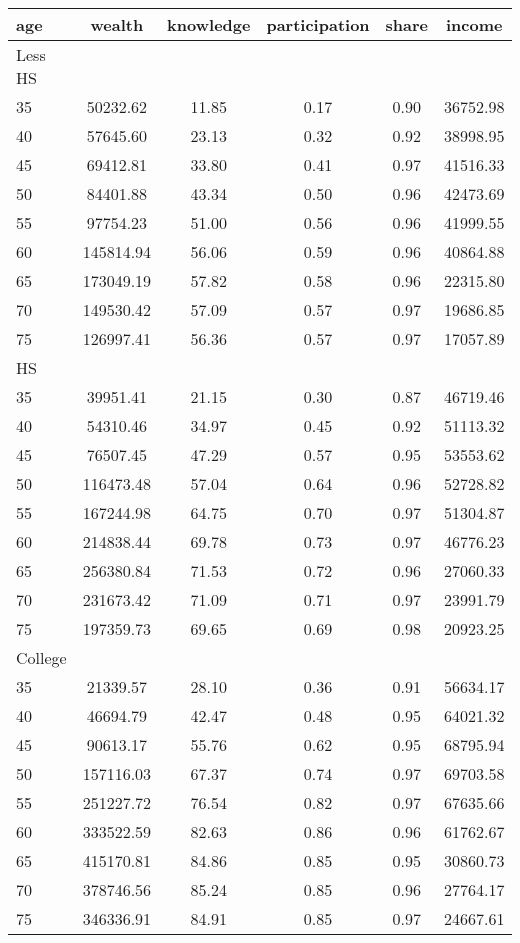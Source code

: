  \begin{tabular}{lccccc}
 \hline \hline
  age & wealth & knowledge & participation & share & income \\
 \hline
 Less HS & & & & & \\
 \hline
35 &  50232.62 &     11.85 &      0.17 &      0.90 &  36752.98 \\ 
40 &  57645.60 &     23.13 &      0.32 &      0.92 &  38998.95 \\ 
45 &  69412.81 &     33.80 &      0.41 &      0.97 &  41516.33 \\ 
50 &  84401.88 &     43.34 &      0.50 &      0.96 &  42473.69 \\ 
55 &  97754.23 &     51.00 &      0.56 &      0.96 &  41999.55 \\ 
60 & 145814.94 &     56.06 &      0.59 &      0.96 &  40864.88 \\ 
65 & 173049.19 &     57.82 &      0.58 &      0.96 &  22315.80 \\ 
70 & 149530.42 &     57.09 &      0.57 &      0.97 &  19686.85 \\ 
75 & 126997.41 &     56.36 &      0.57 &      0.97 &  17057.89 \\ 
 \hline
 HS & & & & & \\
 \hline
35 &  39951.41 &     21.15 &      0.30 &      0.87 &  46719.46 \\ 
40 &  54310.46 &     34.97 &      0.45 &      0.92 &  51113.32 \\ 
45 &  76507.45 &     47.29 &      0.57 &      0.95 &  53553.62 \\ 
50 & 116473.48 &     57.04 &      0.64 &      0.96 &  52728.82 \\ 
55 & 167244.98 &     64.75 &      0.70 &      0.97 &  51304.87 \\ 
60 & 214838.44 &     69.78 &      0.73 &      0.97 &  46776.23 \\ 
65 & 256380.84 &     71.53 &      0.72 &      0.96 &  27060.33 \\ 
70 & 231673.42 &     71.09 &      0.71 &      0.97 &  23991.79 \\ 
75 & 197359.73 &     69.65 &      0.69 &      0.98 &  20923.25 \\ 
 \hline
 College & & & & & \\
 \hline
35 &  21339.57 &     28.10 &      0.36 &      0.91 &  56634.17 \\ 
40 &  46694.79 &     42.47 &      0.48 &      0.95 &  64021.32 \\ 
45 &  90613.17 &     55.76 &      0.62 &      0.95 &  68795.94 \\ 
50 & 157116.03 &     67.37 &      0.74 &      0.97 &  69703.58 \\ 
55 & 251227.72 &     76.54 &      0.82 &      0.97 &  67635.66 \\ 
60 & 333522.59 &     82.63 &      0.86 &      0.96 &  61762.67 \\ 
65 & 415170.81 &     84.86 &      0.85 &      0.95 &  30860.73 \\ 
70 & 378746.56 &     85.24 &      0.85 &      0.96 &  27764.17 \\ 
75 & 346336.91 &     84.91 &      0.85 &      0.97 &  24667.61 \\ 
 \hline \hline
 \end{tabular}

